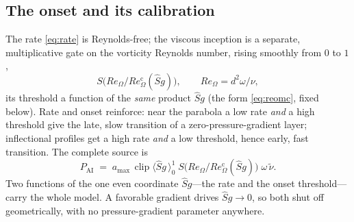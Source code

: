 \documentclass[journal]{new-aiaa}
\begin{document}
\subsection{The onset and its calibration}\label{sec:onset}\label{sec:calib_onset}
The rate \eqref{eq:rate} is Reynolds-free; the viscous inception is a separate,
multiplicative gate on the vorticity Reynolds number, rising smoothly from $0$
to $1$,
\begin{equation}
  S\!\big(Re_\Omega / Re_\Omega^{\mathrm c}(\hat S g)\big),
  \qquad Re_\Omega = d^2\omega/\nu ,
  \label{eq:onset}
\end{equation}
its threshold a function of the \emph{same} product $\hat S g$ (the form
\eqref{eq:reomc}, fixed below). Rate and onset reinforce: near the
parabola a low rate \emph{and} a high threshold give the late, slow transition
of a zero-pressure-gradient layer; inflectional profiles get a high rate
\emph{and} a low threshold, hence early, fast transition. The complete source
is
\begin{equation}
  P_{\mathrm{AI}} \;=\; a_{\max}\,\operatorname{clip}\!\big\langle \hat S g\,\big\rangle_{0}^{1}\;
  S\!\big(Re_\Omega/Re_\Omega^{\mathrm c}(\hat S g)\big)\;\omega\,\tilde\nu .
  \label{eq:pai}
\end{equation}
Two functions of the one even coordinate $\hat S g$---the rate and the onset
threshold---carry the whole model. A favorable gradient drives
$\hat S g\!\to\!0$, so both shut off geometrically, with no pressure-gradient
parameter anywhere.
\end{document}
